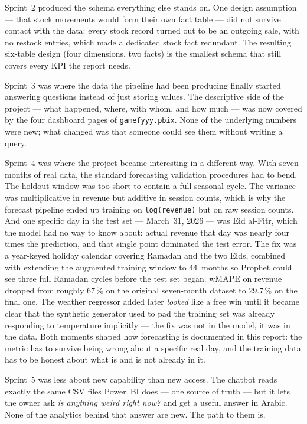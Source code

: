Sprint~2 produced the schema everything else stands on. One design assumption ---
that stock movements would form their own fact table --- did not survive contact
with the data: every stock record turned out to be an outgoing sale, with no
restock entries, which made a dedicated stock fact redundant. The resulting
six-table design (four dimensions, two facts) is the smallest schema that still
covers every KPI the report needs.

Sprint~3 was where the data the pipeline had been producing finally started
answering questions instead of just storing values. The descriptive side of the
project --- what happened, where, with whom, and how much --- was now covered by
the four dashboard pages of \texttt{gamefyyy.pbix}. None of the underlying numbers
were new; what changed was that someone could see them without writing a query.

Sprint~4 was where the project became interesting in a different way. With seven
months of real data, the standard forecasting validation procedures had to bend.
The holdout window was too short to contain a full seasonal cycle. The variance
was multiplicative in revenue but additive in session counts, which is why the
forecast pipeline ended up training on \texttt{log(revenue)} but on raw session
counts. And one specific day in the test set --- March~31, 2026 --- was Eid
al-Fitr, which the model had no way to know about: actual revenue that day was
nearly four times the prediction, and that single point dominated the test error.
The fix was a year-keyed holiday calendar covering Ramadan and the two Eids,
combined with extending the augmented training window to 44~months so Prophet
could see three full Ramadan cycles before the test set began. wMAPE on revenue
dropped from roughly 67\,\% on the original seven-month dataset to 29.7\,\% on
the final one. The weather regressor added later \emph{looked} like a free win
until it became clear that the synthetic generator used to pad the training set
was already responding to temperature implicitly --- the fix was not in the
model, it was in the data. Both moments shaped how forecasting is documented in
this report: the metric has to survive being wrong about a specific real day,
and the training data has to be honest about what is and is not already in it.

Sprint~5 was less about new capability than new access. The chatbot reads
exactly the same CSV files Power~BI does --- one source of truth --- but it
lets the owner ask \emph{is anything weird right now?} and get a useful answer
in Arabic. None of the analytics behind that answer are new. The path to them is.

